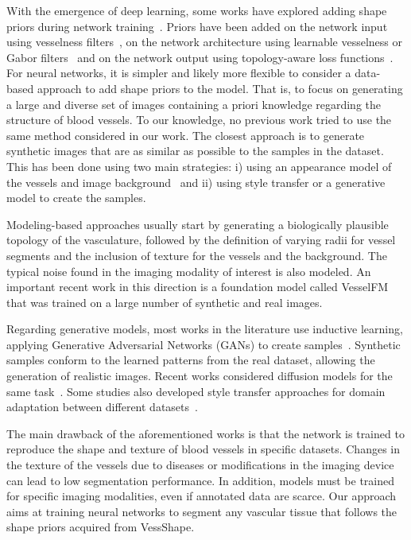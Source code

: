 \documentclass[%
reprint,
nofootinbib,
 amsmath,amssymb,
aps,
superscriptaddress,
showkeys,
longbibliography
]{revtex4-1}
\begin{document}
With the emergence of deep learning, some works have explored adding shape priors during network training~\cite{bohlender2021survey}. Priors have been added on the network input using vesselness filters~\cite{affane2022robust,hu2024domain,garret2024deep}, on the network architecture using learnable vesselness or Gabor filters~\cite{chen2023learnable,fu2018frangi,volkov2025modification} and on the network output using topology-aware loss functions~\cite{shit2021cldice,hu2019topology,berger2024topologically}. For neural networks, it is simpler and likely more flexible to consider a data-based approach to add shape priors to the model. That is, to focus on generating a large and diverse set of images containing a priori knowledge regarding the structure of blood vessels. To our knowledge, no previous work tried to use the same method considered in our work. The closest approach is to generate synthetic images that are as similar as possible to the samples in the dataset. This has been done using two main strategies: i) using an appearance model of the vessels and image background~\cite{tetteh2020deepvesselnet,wittmann2025vesselfm,wittmann2024simulation,mathys2025synthetic} and ii) using style transfer or a generative model to create the samples. 

Modeling-based approaches usually start by generating a biologically plausible topology of the vasculature, followed by the definition of varying radii for vessel segments and the inclusion of texture for the vessels and the background. The typical noise found in the imaging modality of interest is also modeled. An important recent work in this direction is a foundation model called VesselFM~\cite{wittmann2025vesselfm} that was trained on a large number of synthetic and real images.

Regarding generative models, most works in the literature use inductive learning, applying Generative Adversarial Networks (GANs) to create samples~\cite{you2022application,andreini2021two,tavakkoli2020novel,costa2017end}. Synthetic samples conform to the learned patterns from the real dataset, allowing the generation of realistic images. Recent works considered diffusion models for the same task~\cite{go2024generation,guo2025vesseldiffusion,wang2025vastsd}. Some studies also developed style transfer approaches for domain adaptation between different datasets~\cite{peng2022unsupervised,chen2023segmentation,chen2021real}.

The main drawback of the aforementioned works is that the network is trained to reproduce the shape and texture of blood vessels in specific datasets. Changes in the texture of the vessels due to diseases or modifications in the imaging device can lead to low segmentation performance. In addition, models must be trained for specific imaging modalities, even if annotated data are scarce. Our approach aims at training neural networks to segment any vascular tissue that follows the shape priors acquired from VessShape.
\end{document}
